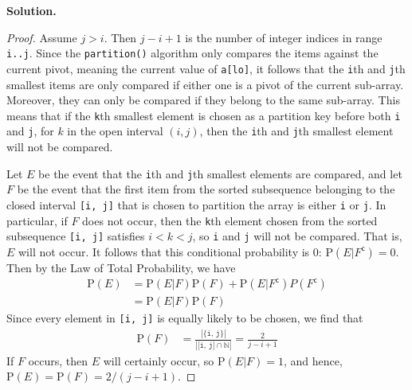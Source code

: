 \documentclass[12pt, a4paper]{article}
\newcommand{\prob}{\text{P}}
\newenvironment{sol}[1][Solution]
{\par\medskip\noindent \textbf{#1.} }
{\medskip}
\begin{document}
	\begin{sol}
		\begin{proof}
			Assume $j>i$. Then $j-i+1$ is the number of integer indices in range \texttt{i..j}.
			Since the \texttt{partition()} algorithm only compares the items
			against the current pivot, meaning the current value of \texttt{a[lo]}, it
			follows that the \texttt{i}th and \texttt{j}th smallest items are only compared
			if either one is a pivot of the current sub-array. Moreover, they can
			only be compared if they belong to the same sub-array. This means that if
			the \texttt{k}th smallest element is chosen as a partition key before both
			\texttt{i} and \texttt{j}, for $k$ in the open interval $(i, j)$, then
			the \texttt{i}th and \texttt{j}th smallest element will not be compared.
			
			Let $E$ be the event that the \texttt{i}th and \texttt{j}th smallest elements
			are compared, and let $F$ be the event that the first item from the sorted
			subsequence belonging to the closed interval \texttt{[i, j]} that is chosen
			to partition the array is either \texttt{i} or \texttt{j}. In particular,
			if $F$ does not occur, then the \texttt{k}th element chosen from the sorted
			subsequence \texttt{[i, j]} satisfies $i < k < j$, so \texttt{i} and \texttt{j}
			will not be compared. That is, $E$ will not occur. It follows that this conditional
			probability is $0$: $\prob(E|F^{\mathsf{c}})=0$. Then by the Law of Total Probability,
			we have
			\begin{align*}
				\prob(E) &= \prob(E|F)\prob(F)+\prob(E|F^{\mathsf{c}})P(F^{\mathsf{c}})\\
				&=\prob(E|F)\prob(F)
			\end{align*}
			Since every element in \texttt{[i, j]} is equally likely to be chosen, 
			we find that
			\begin{align*}
				\prob(F) &= \frac{|\{\texttt{i, j}\}|}{|\texttt{[i, j]}\cap \mathbb{N}|}=\frac{2}{j-i+1}
			\end{align*}
			If $F$ occurs, then $E$ will certainly occur, so $\prob(E|F)=1$, and hence,
			$\prob(E)=\prob(F)=2/(j-i+1)$.
			

\end{proof}
\end{sol}
\end{document}
